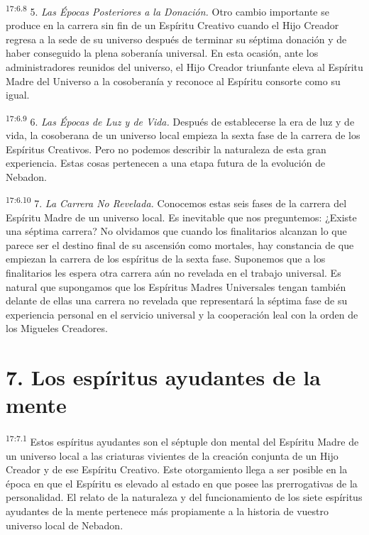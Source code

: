 \par
\textsuperscript{17:6.8} 5. \textit{Las Épocas Posteriores a la Donación.} Otro cambio importante se produce en la carrera sin fin de un Espíritu Creativo cuando el Hijo Creador regresa a la sede de su universo después de terminar su séptima donación y de haber conseguido la plena soberanía universal. En esta ocasión, ante los administradores reunidos del universo, el Hijo Creador triunfante eleva al Espíritu Madre del Universo a la cosoberanía y reconoce al Espíritu consorte como su igual.

\par
\textsuperscript{17:6.9} 6. \textit{Las Épocas de Luz y de Vida.} Después de establecerse la era de luz y de vida, la cosoberana de un universo local empieza la sexta fase de la carrera de los Espíritus Creativos. Pero no podemos describir la naturaleza de esta gran experiencia. Estas cosas pertenecen a una etapa futura de la evolución de Nebadon.

\par
\textsuperscript{17:6.10} 7. \textit{La Carrera No Revelada.} Conocemos estas seis fases de la carrera del Espíritu Madre de un universo local. Es inevitable que nos preguntemos: ¿Existe una séptima carrera? No olvidamos que cuando los finalitarios alcanzan lo que parece ser el destino final de su ascensión como mortales, hay constancia de que empiezan la carrera de los espíritus de la sexta fase. Suponemos que a los finalitarios les espera otra carrera aún no revelada en el trabajo universal. Es natural que supongamos que los Espíritus Madres Universales tengan también delante de ellas una carrera no revelada que representará la séptima fase de su experiencia personal en el servicio universal y la cooperación leal con la orden de los Migueles Creadores.

\section*{7. Los espíritus ayudantes de la mente}
\par
\textsuperscript{17:7.1} Estos espíritus ayudantes son el séptuple don mental del Espíritu Madre de un universo local a las criaturas vivientes de la creación conjunta de un Hijo Creador y de ese Espíritu Creativo. Este otorgamiento llega a ser posible en la época en que el Espíritu es elevado al estado en que posee las prerrogativas de la personalidad. El relato de la naturaleza y del funcionamiento de los siete espíritus ayudantes de la mente pertenece más propiamente a la historia de vuestro universo local de Nebadon.

